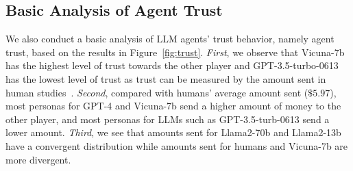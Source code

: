 \subsection{Basic Analysis of Agent Trust}
\vspace{-1.5mm}
We also conduct a basic analysis of LLM agents' trust behavior, namely agent trust, based on the results in Figure~\ref{fig:trust}. \textit{First}, we observe that Vicuna-7b has the highest level of trust towards the other player and GPT-3.5-turbo-0613 has the lowest level of trust as trust can be measured by the amount sent in human studies~\citep{Measuring_Trust,cesariniHeritabilityCooperativeBehavior2008}. \textit{Second}, compared with humans' average amount sent ($\$5.97$), most personas for GPT-4 and Vicuna-7b send a higher amount of money to the other player, and most personas for LLMs such as GPT-3.5-turb-0613 send a lower amount. \textit{Third}, we see that amounts sent for Llama2-70b and Llama2-13b have a convergent distribution while amounts sent for humans and Vicuna-7b are more divergent.


















